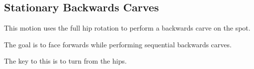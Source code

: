 \subsection*{Stationary Backwards Carves}

This motion uses the full hip rotation to perform a backwards carve on the spot. 

The goal is to face forwards while performing sequential backwards carves. 

The key to this is to turn from the hips.
